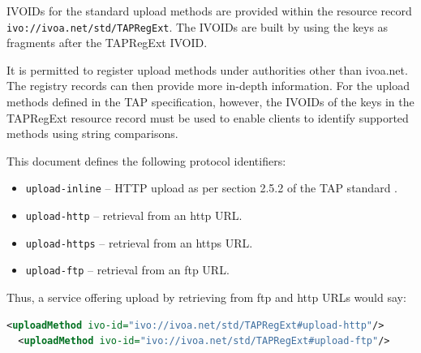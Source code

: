 \documentclass{ivoa}
\begin{document}
IVOIDs for the standard upload methods are provided within the
resource record
\texttt{ivo://ivoa.net/std/TAPRegExt}.  
The IVOIDs are built by using the keys as fragments after the 
TAPRegExt IVOID.

It is permitted to register upload methods under authorities other than
ivoa.net.
The registry records can then provide more in-depth information. For
the upload methods defined in the TAP specification, however, 
the IVOIDs of the keys in the TAPRegExt resource record must be used to enable
clients to identify supported methods using string comparisons.

This document defines the following protocol identifiers:


\begin{itemize}

\item \texttt{upload-inline} -- HTTP upload as per section 2.5.2 of 
the TAP standard \citep{2019ivoa.spec.0927D}.{}

\item \texttt{upload-http} -- retrieval from an http URL.{}

\item \texttt{upload-https} -- retrieval from an https URL.{}

\item \texttt{upload-ftp} -- retrieval from an ftp URL.{}

\end{itemize}

Thus, a service offering upload by retrieving from ftp and http URLs
would say:


\begin{lstlisting}[language=XML,basicstyle=\footnotesize]
  <uploadMethod ivo-id="ivo://ivoa.net/std/TAPRegExt#upload-http"/>
  <uploadMethod ivo-id="ivo://ivoa.net/std/TAPRegExt#upload-ftp"/>
\end{lstlisting}
\end{document}
